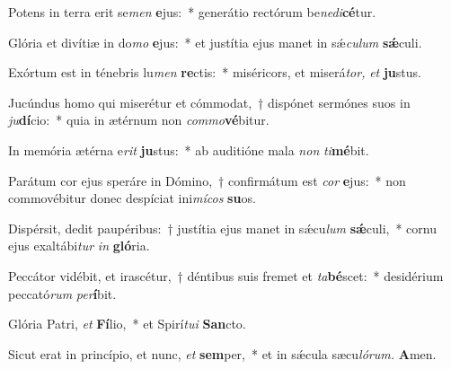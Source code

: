 \item Potens in terra erit se\textit{men} \textbf{e}jus:~* generátio rectórum be\textit{nedi}\textbf{cé}tur.
\item Glória et divítiæ in do\textit{mo} \textbf{e}jus:~* et justítia ejus manet in sǽ\tinyhspace\textit{culum} \textbf{sǽ}culi.
\item Exórtum est in ténebris lu\textit{men} \textbf{re}ctis:~* miséricors, et miserá\textit{tor,} \textit{et} \textbf{ju}stus.
\item Jucúndus homo qui miserétur et cómmodat,~† dispónet sermónes suos in \textit{ju}\textbf{dí}cio:~* quia in ætérnum non \textit{commo}\textbf{vé}bitur.
\item In memória ætérna e\tinyhspace\textit{rit} \textbf{ju}stus:~* ab auditióne mala \textit{non} \textit{ti}\textbf{mé}bit.
\item Parátum cor ejus speráre in Dómino,~† confirmátum est \textit{cor} \textbf{e}jus:~* non commovébitur donec despíciat ini\textit{mícos} \textbf{su}os.
\item Dispérsit, dedit paupéribus:~† justítia ejus manet in sǽcu\textit{lum} \textbf{sǽ}culi,~* cornu ejus exaltábi\textit{tur} \textit{in} \textbf{gló}ria.
\item Peccátor vidébit, et irascétur,~† déntibus suis fremet et \textit{ta}\textbf{bé}scet:~* desidérium peccató\textit{rum} \textit{per}\textbf{í}bit.
\item Glória Patri, \textit{et} \textbf{Fí}lio,~* et Spirí\tinyhspace\textit{tui} \textbf{San}cto.
\item Sicut erat in princípio, et nunc, \textit{et} \textbf{sem}per,~* et in sǽcula sæcu\tinyhspace\textit{lórum.} \textbf{A}men.